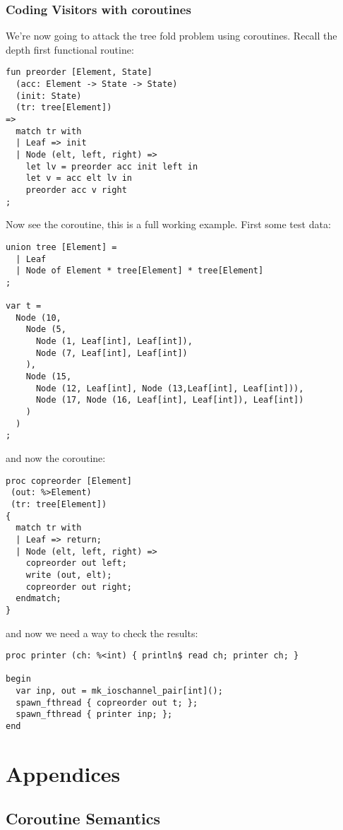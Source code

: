 \documentclass[oneside]{book}
\begin{document}
\section{Coding Visitors with coroutines}
We're now going to attack the tree fold problem using coroutines.
Recall the depth first functional routine:

\begin{verbatim}
fun preorder [Element, State]
  (acc: Element -> State -> State)
  (init: State)
  (tr: tree[Element])
=>
  match tr with
  | Leaf => init
  | Node (elt, left, right) =>
    let lv = preorder acc init left in
    let v = acc elt lv in
    preorder acc v right
;
\end{verbatim}

Now see the coroutine, this is a full working example.
First some test data:

\begin{verbatim}
union tree [Element] =
  | Leaf
  | Node of Element * tree[Element] * tree[Element]
;

var t = 
  Node (10,
    Node (5,
      Node (1, Leaf[int], Leaf[int]),
      Node (7, Leaf[int], Leaf[int])
    ),
    Node (15,
      Node (12, Leaf[int], Node (13,Leaf[int], Leaf[int])),
      Node (17, Node (16, Leaf[int], Leaf[int]), Leaf[int])
    )
  )
;
\end{verbatim}

and now the coroutine:


\begin{verbatim}
proc copreorder [Element]
 (out: %>Element)
 (tr: tree[Element])
{
  match tr with
  | Leaf => return; 
  | Node (elt, left, right) =>
    copreorder out left;
    write (out, elt);
    copreorder out right;
  endmatch;
}
\end{verbatim}

and now we need a way to check the results:

\begin{verbatim}
proc printer (ch: %<int) { println$ read ch; printer ch; }

begin
  var inp, out = mk_ioschannel_pair[int]();
  spawn_fthread { copreorder out t; };
  spawn_fthread { printer inp; };
end
\end{verbatim}


\part{Appendices}
\chapter{Coroutine Semantics}
\label{Coroutine Semantics}
\end{document}
